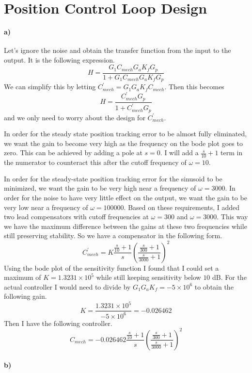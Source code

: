 \documentclass[12pt]{article}
\begin{document}
\section{Position Control Loop Design}

\paragraph{a)}

Let's ignore the noise and obtain the transfer function from the input to the output. It is the following expression.
\[H = \frac{G_1C_{mech}G_aK_fG_p}{1+G_1C_{mech}G_aK_fG_p}\]
We can simplify this by letting \(C^\prime_{mech}=G_1G_aK_fC_{mech}\). Then this becomes
\[H = \frac{C^\prime_{mech}G_p}{1+C^\prime_{mech}G_p}\]
and we only need to worry about the design for \(C^\prime_{mech}\).

In order for the steady state position tracking error to be almost fully eliminated, we want the gain to
become very high as the frequency on the bode plot goes to zero. This can be achieved by adding a pole at \(s=0\).
I will add a \(\frac{s}{10}+1\) term in the numerator to counteract this after the cutoff frequency of \(\omega=10\).

In order for the steady-state position tracking error for the sinusoid to be minimized, we want the gain to be very
high near a frequency of \(\omega=3000\). In order for the noise to have very little effect on the output, we want the gain
to be very low near a frequency of \(\omega=100000\). Based on these requirements, I added two lead compensators with
cutoff frequencies at \(\omega=300\) and \(\omega=3000\). This way we have the maximum difference between the gains at these
two frequencies while still preserving stability. So we have a compensator in the following form.
\[C^\prime_{mech}=K\frac{\frac{s}{10}+1}{s}\left(\frac{\frac{s}{300}+1}{\frac{s}{3000}+1}\right)^2\]
Using the bode plot of the sensitivity function I found that I could set a maximum of \(K=1.3231\times 10^5\) while still
keeping sensitivity below \(10\) dB. For the actual controller I would need to divide by \(G_1G_aK_f=-5\times 10^6\) to
obtain the following gain.
\[K=\frac{1.3231\times10^5}{-5\times 10^6}=-0.026462\]
Then I have the following controller.
\[C_{mech}=-0.026462\frac{\frac{s}{10}+1}{s}\left(\frac{\frac{s}{300}+1}{\frac{s}{3000}+1}\right)^2\]

\paragraph{b)}
\end{document}
